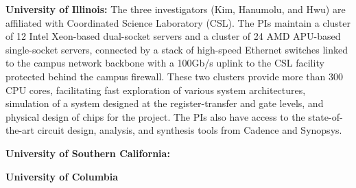 \noindent
\textbf{University of Illinois:}
The three investigators (Kim, Hanumolu, and Hwu) are affiliated with Coordinated Science Laboratory (CSL). 
The PIs maintain a cluster of 12 Intel Xeon-based dual-socket servers and a cluster of 24 AMD APU-based single-socket servers, connected by a stack of high-speed Ethernet switches linked to the campus network backbone with a 100Gb/s uplink to the CSL facility protected behind the campus firewall.
These two clusters provide more than 300 CPU cores, facilitating fast exploration of various system architectures, simulation of a system designed at the register-transfer and gate levels, and physical design of chips for the project.
The PIs also have access to the state-of-the-art circuit design, analysis, and synthesis tools from Cadence and Synopsys.

\noindent
\textbf{University of Southern California:}

\noindent
\textbf{University of Columbia}

